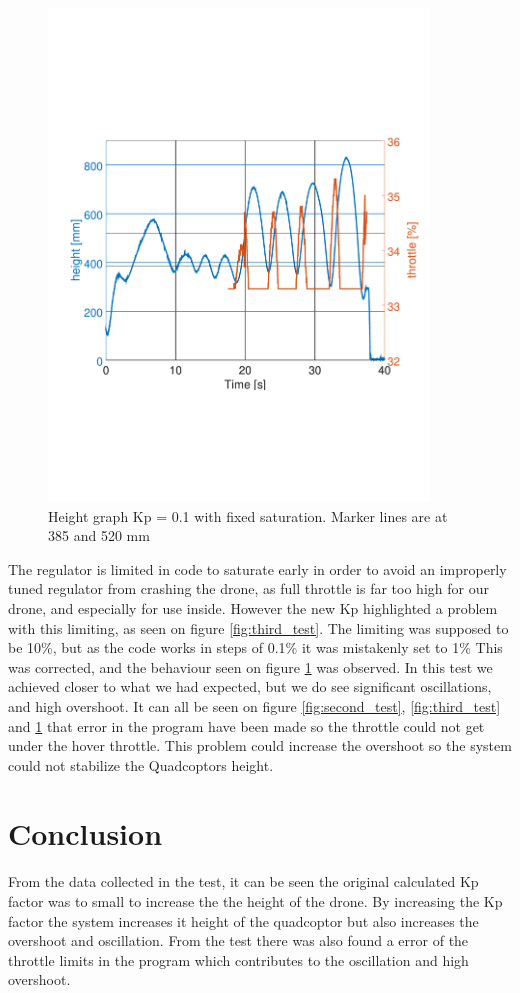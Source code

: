 \begin{figure}[h]
    \centering
    \includegraphics[width=0.9\textwidth, trim={0 7cm 0 7cm},clip]{figures/Appendix/final_test/kp0,1fix.pdf}
    \caption{Height graph Kp = 0.1 with fixed saturation. Marker lines are at 385 and 520 mm}
    \label{fig:fourth_test}
\end{figure}


The regulator is limited in code to saturate early in order to avoid an improperly tuned regulator from crashing the drone, as full throttle is far too high for our drone, and especially for use inside. However the new Kp highlighted a problem with this limiting, as seen on figure \ref{fig:third_test}. The limiting was supposed to be 10\%, but as the code works in steps of 0.1\% it was mistakenly set to 1\% This was corrected, and the behaviour seen on figure \ref{fig:fourth_test} was observed. In this test we achieved closer to what we had expected, but we do see significant oscillations, and high overshoot.
It can all be seen on figure \ref{fig:second_test}, \ref{fig:third_test} and \ref{fig:fourth_test} that error in the program have been made so the throttle could not get under the hover throttle. This problem could increase the overshoot so the system could not stabilize the Quadcoptors height.

\section*{Conclusion}
From the data collected in the test, it can be seen the original calculated Kp factor was to small to increase the the height of the drone. By increasing the Kp factor the system increases it height of the quadcoptor but also increases the overshoot and oscillation.
From the test there was also found a error of the throttle limits in the program which contributes to the oscillation and high overshoot.